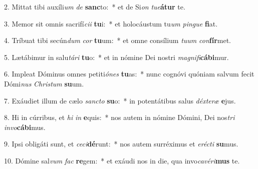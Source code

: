 2. Mittat tibi auxíli\textit{um} \textit{de} \textbf{sanc}to:~*  et de Si\textit{on} \textit{tu}\textit{e}\textbf{á}\textbf{tur} te.\

3. Memor sit omnis sacrifí\textit{ci}\textit{i} \textbf{tu}i:~*  et holocáustum tu\textit{um} \textit{pin}\textit{gue} \textbf{fi}at.\

4. Tríbuat tibi secún\textit{dum} \textit{cor} \textbf{tu}um:~*  et omne consílium \textit{tu}\textit{um} \textit{con}\textbf{fír}met.\

5. Lætábimur in salu\textit{tá}\textit{ri} \textbf{tu}o:~*  et in nómine Dei nostri \textit{ma}\textit{gni}\textit{fi}\textbf{cá}\textbf{bi}mur.\

6. Impleat Dóminus omnes petiti\textit{ó}\textit{nes} \textbf{tu}as:~*  nunc cognóvi quóniam salvum fecit Dómi\textit{nus} \textit{Chris}\textit{tum} \textbf{su}um.\

7. Exáudiet illum de cælo \textit{sanc}\textit{to} \textbf{su}o:~*  in potentátibus salus \textit{déx}\textit{te}\textit{ræ} \textbf{e}jus.\

8. Hi in cúrribus, et \textit{hi} \textit{in} \textbf{e}quis:~*  nos autem in nómine Dómini, Dei nos\textit{tri} \textit{in}\textit{vo}\textbf{cá}\textbf{bi}mus.\

9. Ipsi obligáti sunt, et \textit{ce}\textit{ci}\textbf{dé}runt:~*  nos autem surréximus et \textit{e}\textit{réc}\textit{ti} \textbf{su}mus.\

10. Dómine sal\textit{vum} \textit{fac} \textbf{re}gem:~*  et exáudi nos in die, qua invo\textit{ca}\textit{vé}\textit{ri}\textbf{mus} te.\

